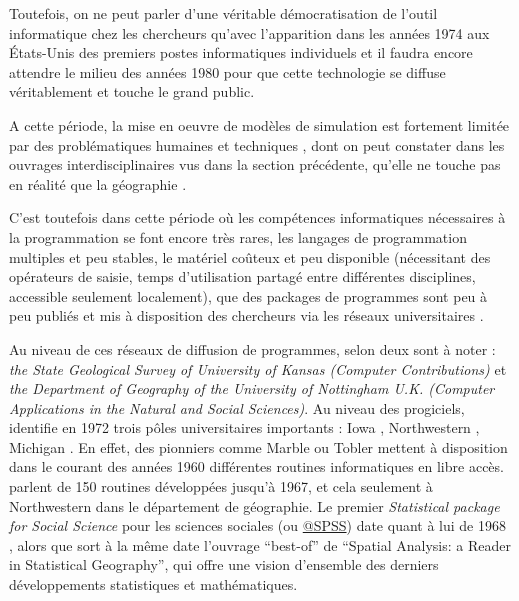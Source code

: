 Toutefois, on ne peut parler d'une véritable démocratisation de l'outil informatique chez les chercheurs qu'avec l'apparition dans les années 1974 aux États-Unis des premiers postes informatiques individuels \autocite[221]{Ceruzzi2000} et il faudra encore attendre le milieu des années 1980 pour que cette technologie se diffuse véritablement et touche le grand public.

A cette période, la mise en oeuvre de modèles de simulation est fortement limitée par des problématiques humaines et techniques \autocites{Haggett1969}[387]{Marble1972}, dont on peut constater dans les ouvrages interdisciplinaires vus dans la section précédente, qu'elle ne touche pas en réalité que la géographie \autocite{Guetzkow1972}.

C'est toutefois dans cette période où les compétences informatiques nécessaires à la programmation se font encore très rares, les langages de programmation multiples et peu stables, le matériel coûteux et peu disponible (nécessitant des opérateurs de saisie, temps d'utilisation partagé entre différentes disciplines, accessible seulement localement), que des packages de programmes sont peu à peu publiés et mis à disposition des chercheurs via les réseaux universitaires \autocite{Haggett1969}.

Au niveau de ces réseaux de diffusion de programmes, selon \textcite[20-21]{Greer1972} deux sont à noter : \textit{the State Geological Survey of University of Kansas (Computer Contributions)}  et \textit{ the Department of Geography of the University of Nottingham U.K. (Computer Applications in the Natural and Social Sciences)}. Au niveau des progiciels, \textcite[20-21]{Greer1972} identifie en 1972 trois pôles universitaires importants : Iowa \autocite{Wittick1968}, Northwestern \autocites{Marble1967, Marble1972b, Marble1972,Marble2010}, Michigan \autocite{Tobler1970c} . En effet, des pionniers comme Marble ou Tobler mettent à disposition dans le courant des années 1960 différentes routines informatiques en libre accès. \textcites[3]{Marble1967, Pitts1968} parlent de 150 routines développées jusqu'à 1967, et cela seulement à Northwestern dans le département de géographie. Le premier \textit{Statistical package for Social Science} pour les sciences sociales (ou \href{http://www.spss.com.hk/corpinfo/history.htm}{@SPSS}) date quant à lui de 1968 \autocite{Barnes2011}, alors que sort à la même date l'ouvrage \foreignquote{english}{best-of} de \textcite{Berry1968} \foreignquote{english}{Spatial Analysis: a Reader in Statistical Geography}, qui offre une vision d'ensemble des derniers développements statistiques et mathématiques.

